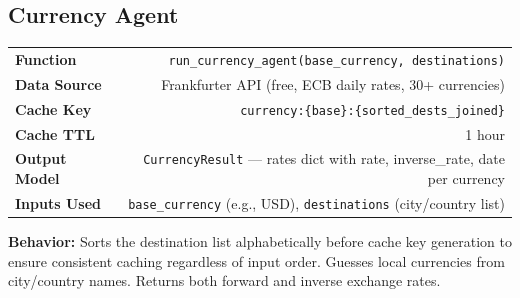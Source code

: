 \documentclass[11pt,a4paper]{article}
\begin{document}
\subsection{Currency Agent}
\begin{infobox}
{\small
\begin{tabularx}{\textwidth}{@{}L{3cm}R@{}}
\textbf{Function}     & \texttt{run\_currency\_agent(base\_currency, destinations)} \\[3pt]
\textbf{Data Source}   & Frankfurter API (free, ECB daily rates, 30+ currencies) \\[3pt]
\textbf{Cache Key}     & \texttt{currency:\{base\}:\{sorted\_dests\_joined\}} \\[3pt]
\textbf{Cache TTL}     & 1 hour \\[3pt]
\textbf{Output Model}  & \texttt{CurrencyResult} --- rates dict with rate, inverse\_rate, date per currency \\[3pt]
\textbf{Inputs Used}   & \texttt{base\_currency} (e.g., USD), \texttt{destinations} (city/country list) \\
\end{tabularx}}

\textbf{Behavior:} Sorts the destination list alphabetically before cache key generation to ensure consistent caching regardless of input order. Guesses local currencies from city/country names. Returns both forward and inverse exchange rates.
\end{infobox}

\end{document}
